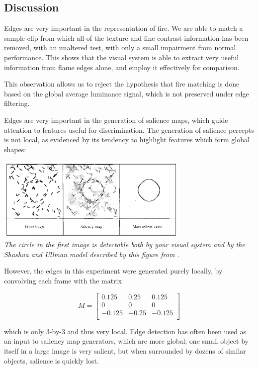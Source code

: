 \subsection{Discussion}


Edges are very important in the representation of fire. We are able to match a sample clip from which all of the texture and fine contrast information has been removed, with an unaltered test, with only a small impairment from normal performance. This shows that the visual system is able to extract very useful information from flame edges alone, and employ it effectively for comparison.

This observation allows us to reject the hypothesis that fire matching is done based on the global average luminance signal, which is not preserved under edge filtering.

Edges are very important in the generation of salience maps\cite{alter1998extracting}, which guide attention to features useful for discrimination. The generation of salience percepts is not local, as evidenced by its tendency to highlight features which form global shapes:

\begin{center}
\includegraphics[width=0.7\textwidth]{img/salience}\\
\textit{The circle in the first image is detectable both by your visual system and by the Shashua and Ullman model described by this figure from \cite{alter1998extracting}.}
\end{center}

However, the edges in this experiment were generated purely locally, by convolving each frame with the matrix


\[
M=
  \begin{bmatrix}
    0.125 & 0.25 & 0.125\\
    0 & 0 & 0\\
-0.125 & -0.25 & -0.125\\
  \end{bmatrix}
\]

which is only 3-by-3 and thus very local. Edge detection has often been used as an input to saliency map generators, which are more global; one small object by itself in a large image is very salient, but when surrounded by dozens of similar objects, salience is quickly lost.

